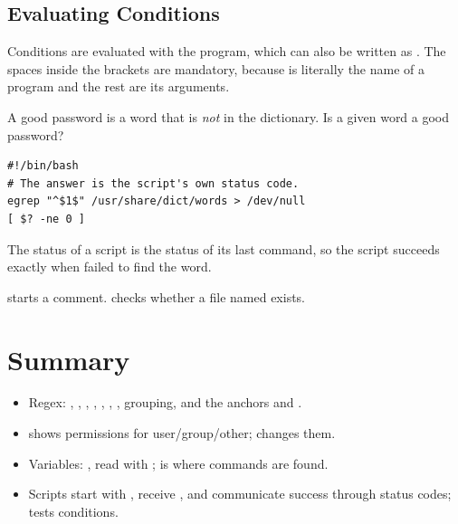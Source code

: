 \subsection{Evaluating Conditions}
Conditions are evaluated with the  program, which can also be written
as \code{[ ... ]}. The spaces inside the brackets are mandatory, because
\code{[} is literally the name of a program and the rest are its arguments.

\begin{example}
A good password is a word that is \emph{not} in the dictionary. Is a given word a
good password?
\begin{lstlisting}[style=bash]
#!/bin/bash
# The answer is the script's own status code.
egrep "^$1$" /usr/share/dict/words > /dev/null
[ $? -ne 0 ]
\end{lstlisting}
The status of a script is the status of its last command, so the script
succeeds exactly when  failed to find the word.
\end{example}

\code{\#} starts a comment. \code{[ -e basic ]} checks whether a file named
 exists.

\section*{Summary}
\begin{itemize}
  \item Regex: \code{[...]}, \code{[\^{}...]}, , \code{*}, \code{+},
        , \code{|}, grouping, and the anchors \code{\^{}} and \code{\$}.
  \item {} shows  permissions for user/group/other;
         changes them.
  \item Variables: , read with ;  is where
        commands are found.
  \item Scripts start with , receive , and
        communicate success through status codes; \code{[ ]} tests conditions.
\end{itemize}
